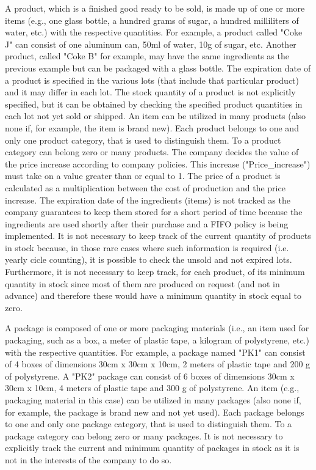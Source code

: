 A product, which is a finished good ready to be sold, is made up of one or more items (e.g., one glass bottle, a hundred grams of sugar, a hundred milliliters of water, etc.) with the respective quantities. For example, a product called "Coke J" can consist of one aluminum can, 50ml of water, 10g of sugar, etc. Another product, called "Coke B" for example, may have the same ingredients as the previous example but can be packaged with a glass bottle. The expiration date of a product is specified in the various lots (that include that particular product) and it may differ in each lot. The stock quantity of a product is not explicitly specified, but it can be obtained by checking the specified product quantities in each lot not yet sold or shipped. An item can be utilized in many products (also none if, for example, the item is brand new). Each product belongs to one and only one product category, that is used to distinguish them. To a product category can belong zero or many products. The company decides the value of the price increase according to company policies. This increase ("Price\_increase") must take on a value greater than or equal to 1. The price of a product is calculated as a multiplication between the cost of production and the price increase. The expiration date of the ingredients (items) is not tracked as the company guarantees to keep them stored for a short period of time because the ingredients are used shortly after their purchase and a FIFO policy is being implemented. It is not necessary to keep track of the current quantity of products in stock because, in those rare cases where such information is required (i.e. yearly cicle counting), it is possible to check the unsold and not expired lots. Furthermore, it is not necessary to keep track, for each product, of its minimum quantity in stock since most of them are produced on request (and not in advance) and therefore these would have a minimum quantity in stock equal to zero.


A package is composed of one or more packaging materials (i.e., an item used for packaging, such as a box, a meter of plastic tape, a kilogram of polystyrene, etc.) with the respective quantities. For example, a package named "PK1" can consist of 4 boxes of dimensions 30cm x 30cm x 10cm, 2 meters of plastic tape and 200 g of polystyrene. A "PK2" package can consist of 6 boxes of dimensions 30cm x 30cm x 10cm, 4 meters of plastic tape and 300 g of polystyrene. An item (e.g., packaging material in this case) can be utilized in many packages (also none if, for example, the package is brand new and not yet used). Each package belongs to one and only one package category, that is used to distinguish them. To a package category can belong zero or many packages. It is not necessary to explicitly track the current and minimum quantity of packages in stock as it is not in the interests of the company to do so.


